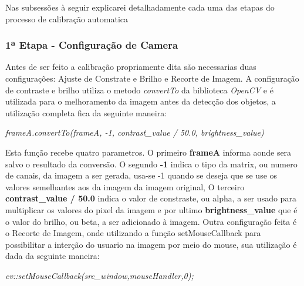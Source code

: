 	
			
	Nas subsessões à seguir explicarei detalhadamente cada uma das etapas do processo de calibração automatica
	\subsubsection{1ª Etapa - Configuração de Camera}
Antes de ser feito a calibração propriamente dita são necessarias duas configurações: Ajuste de Constrate e Brilho e Recorte de Imagem.
A configuração de contraste e brilho utiliza o metodo \textit{convertTo} da biblioteca \textit{OpenCV} e é utilizada para o melhoramento da imagem antes da detecção dos objetos, a utilização completa fica da seguinte maneira:
\begin{center}
\centering \textit{ frameA.convertTo(frameA, -1, contrast\_value / 50.0, brightness\_value)}
\end{center}
Esta função recebe quatro parametros. O primeiro \textbf{frameA} informa aonde sera salvo o resultado da conversão. O segundo \textbf{-1} indica o tipo da matrix, ou numero de canais, da imagem a ser gerada, usa-se -1 quando se deseja que se use os valores semelhantes aos da imagem da imagem original\cite{OpenCV}, O terceiro \textbf{contrast\_value / 50.0} indica o valor de constraste, ou alpha, a ser usado para multiplicar os valores do pixel da imagem\cite{OpenCV} e por ultimo \textbf{brightness\_value} que é o valor do brilho, ou beta, a ser adicionado à imagem. \newline
Outra configuração feita é o Recorte de Imagem, onde utilizando a função setMouseCallback para possibilitar a interção do usuario na imagem por meio do mouse, sua utilização é dada da seguinte maneira:
\begin{center}
\centering \textit{ cv::setMouseCallback(src\_window,mouseHandler,0);}
\end{center}
